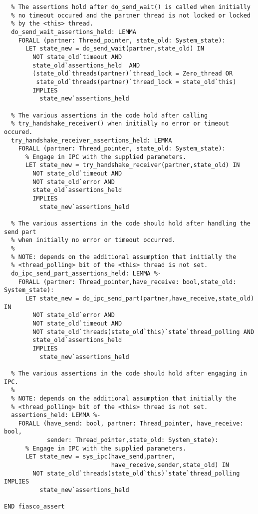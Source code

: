 \begin{lstlisting}
  % The assertions hold after do_send_wait() is called when initially 
  % no timeout occured and the partner thread is not locked or locked
  % by the <this> thread.
  do_send_wait_assertions_held: LEMMA
    FORALL (partner: Thread_pointer, state_old: System_state):
      LET state_new = do_send_wait(partner,state_old) IN
        NOT state_old`timeout AND
        state_old`assertions_held  AND        
        (state_old`threads(partner)`thread_lock = Zero_thread OR
         state_old`threads(partner)`thread_lock = state_old`this) 
        IMPLIES 
          state_new`assertions_held 

  % The various assertions in the code hold after calling 
  % try_handshake_receiver() when initially no error or timeout occured.
  try_handshake_receiver_assertions_held: LEMMA
    FORALL (partner: Thread_pointer, state_old: System_state):
      % Engage in IPC with the supplied parameters.
      LET state_new = try_handshake_receiver(partner,state_old) IN
        NOT state_old`timeout AND 
        NOT state_old`error AND   
        state_old`assertions_held
        IMPLIES
          state_new`assertions_held

  % The various assertions in the code should hold after handling the send part
  % when initially no error or timeout occurred.
  %
  % NOTE: depends on the additional assumption that initially the 
  % <thread_polling> bit of the <this> thread is not set.
  do_ipc_send_part_assertions_held: LEMMA %-
    FORALL (partner: Thread_pointer,have_receive: bool,state_old: System_state):
      LET state_new = do_ipc_send_part(partner,have_receive,state_old) IN
        NOT state_old`error AND 
        NOT state_old`timeout AND
        NOT state_old`threads(state_old`this)`state`thread_polling AND
        state_old`assertions_held
        IMPLIES
          state_new`assertions_held
    
  % The various assertions in the code should hold after engaging in IPC.
  %
  % NOTE: depends on the additional assumption that initially the 
  % <thread_polling> bit of the <this> thread is not set.
  assertions_held: LEMMA %-
    FORALL (have_send: bool, partner: Thread_pointer, have_receive: bool,
            sender: Thread_pointer,state_old: System_state):
      % Engage in IPC with the supplied parameters.
      LET state_new = sys_ipc(have_send,partner,
                              have_receive,sender,state_old) IN
        NOT state_old`threads(state_old`this)`state`thread_polling IMPLIES
          state_new`assertions_held

END fiasco_assert
\end{lstlisting}
